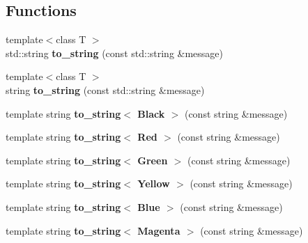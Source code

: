 \subsection*{Functions}
\begin{DoxyCompactItemize}
\item 
\mbox{\label{namespace_g_a_1_1color_a991c9678371bcdbab15601fb7effba9e}} 
{\footnotesize template$<$class T $>$ }\\std\+::string {\bfseries to\+\_\+string} (const std\+::string \&message)
\item 
\mbox{\label{namespace_g_a_1_1color_ac7fb00295164b2849f9b10301687db74}} 
{\footnotesize template$<$class T $>$ }\\string {\bfseries to\+\_\+string} (const std\+::string \&message)
\item 
\mbox{\label{namespace_g_a_1_1color_a5be6c7e4f882c4d592a8da0f0a347067}} 
template string {\bfseries to\+\_\+string$<$ Black $>$} (const string \&message)
\item 
\mbox{\label{namespace_g_a_1_1color_a6a01cc38b05e377a20433414f3706a0b}} 
template string {\bfseries to\+\_\+string$<$ Red $>$} (const string \&message)
\item 
\mbox{\label{namespace_g_a_1_1color_a14e62c006964b6702bbdd28346bf4bab}} 
template string {\bfseries to\+\_\+string$<$ Green $>$} (const string \&message)
\item 
\mbox{\label{namespace_g_a_1_1color_aff5ba9dcdd27d18076ee85ffe9606efc}} 
template string {\bfseries to\+\_\+string$<$ Yellow $>$} (const string \&message)
\item 
\mbox{\label{namespace_g_a_1_1color_acdf422ae440ac8bc34437328a1cfb519}} 
template string {\bfseries to\+\_\+string$<$ Blue $>$} (const string \&message)
\item 
\mbox{\label{namespace_g_a_1_1color_ae1b271066be4c4b784f12e09159dc895}} 
template string {\bfseries to\+\_\+string$<$ Magenta $>$} (const string \&message)
\item 

\end{DoxyCompactItemize}
